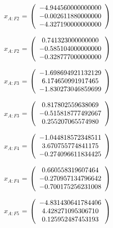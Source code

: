 \begin{description}
$x_{A:F2}$  = $\left( \begin{array} {ccc} -4.944560000000000 \\ -0.002611880000000 \\ -4.327190000000000
\end{array} \right)\\ \\$

$\hat{x}_{A:F2}$  = $\left( \begin{array} {ccc} 0.741323000000000 \\ -0.585104000000000 \\ -0.328777000000000
\end{array} \right)\\ \\$

$x_{A:F3}$  = $\left( \begin{array} {ccc} -1.698694921132129 \\ 6.174650991917465 \\ -1.830273046859699
\end{array} \right)\\ \\$

$\hat{x}_{A:F3}$  = $\left( \begin{array} {ccc} 0.817802559638069 \\ -0.515818777492667 \\ 0.255207065574980
\end{array} \right)\\ \\$

$x_{A:F4}$  = $\left( \begin{array} {ccc} -1.044818572348511 \\ 3.670755774841175 \\ -0.274096611834425
\end{array} \right)\\ \\$

$\hat{x}_{A:F4}$  = $\left( \begin{array} {ccc} 0.660558319607464 \\ -0.270957134796642 \\ -0.700175256231008
\end{array} \right)\\ \\$

$x_{A:F5}$  = $\left( \begin{array} {ccc} -4.831430641784406 \\ 4.428271095306710 \\ 0.125952487453193
\end{array} \right)\\ \\$


\end{description}
